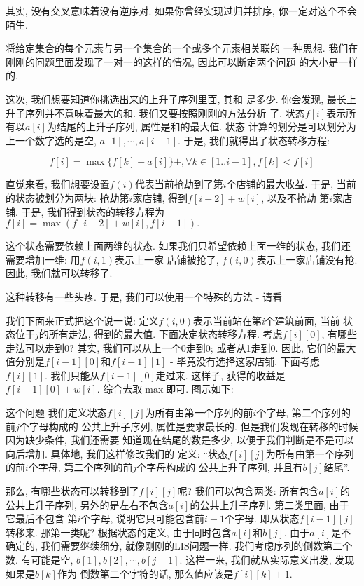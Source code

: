 其实, 没有交叉意味着没有逆序对. 如果你曾经实现过归并排序, 你一定对这个不会陌生. 

 将给定集合的每个元素与另一个集合的一个或多个元素相关联的
一种思想. 我们在刚刚的问题里面发现了一对一的这样的情况, 因此可以断定两个问题
的大小是一样的. 

 这次, 我们想要知道你挑选出来的上升子序列里面, 其和
是多少. 你会发现, 最长上升子序列并不意味着最大的和. 我们又要按照刚刚的方法分析
了.  状态$f[i]$表示所有以$a[i]$为结尾的上升子序列, 属性是和的最大值. 状态
计算的划分是可以划分为上一个数字选的是空, $a[1], \cdots, a[i-1]$. 于是, 
我们就得出了状态转移方程: 

$$f[i] = \max \{f[k]+a[i]\} +, \forall k\in [1..i-1], f[k]<f[i]$$ 

直觉来看, 我们想要设置$f(i)$代表当前抢劫到了第$i$个店铺的最大收益. 于是, 当前
的状态被划分为两块: 抢劫第$i$家店铺, 得到$f[i-2]+w[i]$, 以及不抢劫
第$i$家店铺. 于是, 我们得到状态的转移方程为$f[i]=\max(f[i-2]+w[i], f[i-1]).$

这个状态需要依赖上面两维的状态. 如果我们只希望依赖上面一维的状态, 
我们还需要增加一维: 用$f(i, 1)$表示上一家
店铺被抢了, $f(i, 0)$表示上一家店铺没有抢. 因此, 我们就可以转移了. 

这种转移有一些头疼. 于是, 我们可以使用一个特殊的方法 - 请看


我们下面来正式把这个说一说: 定义$f(i,0)$表示当前站在第$i$个建筑前面, 当前
状态位于$j$的所有走法, 得到的最大值. 下面决定状态转移方程. 考虑$f[i][0]$, 
有哪些走法可以走到0? 其实, 我们可以从上一个0走到0; 或者从1走到0. 因此, 
它们的最大值分别是$f[i-1][0]$和$f[i-1][1]$ - 毕竟没有选择这家店铺. 
下面考虑$f[i][1]$. 我们只能从$f[i-1][0]$走过来. 这样子, 获得的收益是
$f[i-1][0] + w[i]$. 综合去取$\max$即可. 图示如下:


 这个问题
我们定义状态$f[i][j]$为所有由第一个序列的前$i$个字母, 第二个序列的前$j$个字母构成的
公共上升子序列, 属性是要求最长的. 但是我们发现在转移的时候因为缺少条件, 我们还需要
知道现在结尾的数是多少, 以便于我们判断是不是可以向后增加. 具体地, 我们这样修改我们的
定义: ``状态$f[i][j]$为所有由第一个序列的前$i$个字母, 第二个序列的前$j$个字母构成的
公共上升子序列, 并且有$b[j]$结尾''. 

那么, 有哪些状态可以转移到了$f[i][j]$呢? 我们可以包含两类: 所有包含$a[i]$的 
公共上升子序列, 另外的是左右不包含$a[i]$的公共上升子序列. 第二类里面, 由于它最后不包含
第$i$个字母, 说明它只可能包含前$i-1$个字母. 即从状态$f[i-1][j]$转移来. 那第一类呢? 
根据状态的定义, 由于同时包含$a[i]$和$b[j]$. 由于$a[i]$是不确定的, 我们需要继续细分, 
就像刚刚的LIS问题一样. 我们考虑序列的倒数第二个数. 有可能是空, 
$b[1], b[2], \cdots, b[j-1]$. 这样一来, 我们就从实际意义出发, 发现如果是$b[k]$作为
倒数第二个字符的话, 那么值应该是$f[i][k]+1$. 

